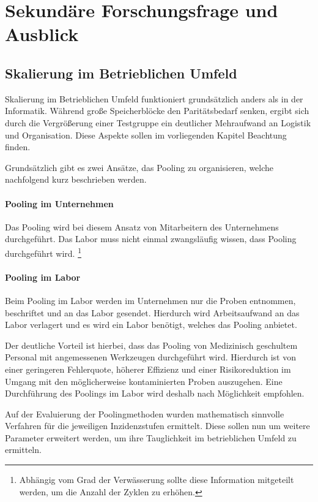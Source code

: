 \chapter{Sekundäre Forschungsfrage und Ausblick}

\section{Skalierung im Betrieblichen Umfeld}
Skalierung im Betrieblichen Umfeld funktioniert grundsätzlich anders als in der Informatik.
Während große Speicherblöcke den Paritätsbedarf senken, ergibt sich durch die Vergrößerung einer Testgruppe ein deutlicher Mehraufwand an Logistik und Organisation. 
Diese Aspekte sollen im vorliegenden Kapitel Beachtung finden.

Grundsätzlich gibt es zwei Ansätze, das Pooling zu organisieren, welche nachfolgend kurz beschrieben werden.

\subsubsection{Pooling im Unternehmen}
Das Pooling wird bei diesem Ansatz von Mitarbeitern des Unternehmens durchgeführt.
Das Labor muss nicht einmal zwangsläufig wissen, dass Pooling durchgeführt wird.
\footnote{Abhängig vom Grad der Verwässerung sollte diese Information mitgeteilt werden, um die Anzahl der Zyklen zu erhöhen.}

\subsubsection{Pooling im Labor}
Beim Pooling im Labor werden im Unternehmen nur die Proben entnommen, beschriftet und an das Labor gesendet.
Hierdurch wird Arbeitsaufwand an das Labor verlagert und es wird ein Labor benötigt, welches das Pooling anbietet.

Der deutliche Vorteil ist hierbei, dass das Pooling von Medizinisch geschultem Personal mit angemessenen Werkzeugen durchgeführt wird.
Hierdurch ist von einer geringeren Fehlerquote, höherer Effizienz und einer Risikoreduktion im Umgang mit den möglicherweise kontaminierten Proben auszugehen.
Eine Durchführung des Poolings im Labor wird deshalb nach Möglichkeit empfohlen.

Auf der Evaluierung der Poolingmethoden wurden mathematisch sinnvolle Verfahren für die jeweiligen Inzidenzstufen ermittelt.
Diese sollen nun um weitere Parameter erweitert werden, um ihre Tauglichkeit im betrieblichen Umfeld zu ermitteln.



